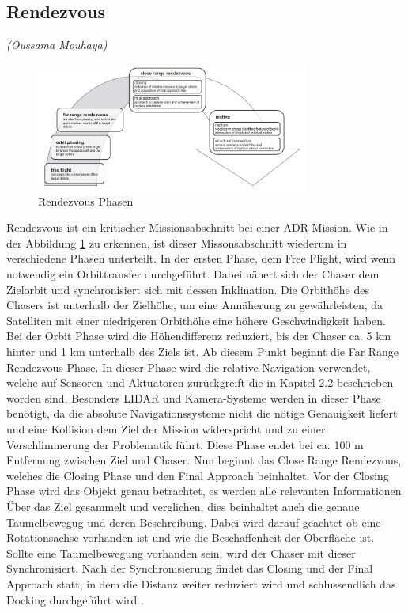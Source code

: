 	\subsection{Rendezvous} 
		\hfill\emph{(Oussama Mouhaya)}\\
	\begin{figure}[h]
			\centering
					\includegraphics[width=0.80\textwidth]{./graphics/ADR/Rendezvous.PNG}
				\caption{Rendezvous Phasen\cite{Castronuovo.2011}}
				\label{fig:Rendezvous}
			\end{figure}
Rendezvous ist ein kritischer Missionsabschnitt bei einer ADR Mission. Wie in der Abbildung \ref{fig:Rendezvous} zu erkennen, ist dieser Missonsabschnitt wiederum in verschiedene Phasen unterteilt. In der ersten Phase, dem Free Flight, wird wenn notwendig ein Orbittransfer durchgeführt. Dabei nähert sich der Chaser dem Zielorbit und synchronisiert sich mit dessen Inklination. Die Orbithöhe des Chasers ist unterhalb der Zielhöhe, um eine Annäherung zu gewährleisten, da Satelliten mit einer niedrigeren Orbithöhe eine höhere Geschwindigkeit haben. Bei der Orbit Phase wird die Höhendifferenz reduziert, bis der Chaser ca. 5 km hinter und 1 km unterhalb des Ziels ist. Ab diesem Punkt beginnt die Far Range Rendezvous Phase. In dieser Phase wird die relative Navigation verwendet, welche auf Sensoren und Aktuatoren zurückgreift die in Kapitel 2.2 beschrieben worden sind. Besonders LIDAR und Kamera-Systeme werden in dieser Phase benötigt, da die absolute Navigationssysteme nicht die nötige Genauigkeit liefert und eine Kollision dem Ziel der Mission widerspricht und zu einer Verschlimmerung der Problematik führt. Diese Phase endet bei ca. 100 m Entfernung zwischen Ziel und Chaser. Nun beginnt das Close Range Rendezvous, welches die Closing Phase und den Final Approach beinhaltet. Vor der Closing Phase wird das Objekt genau betrachtet, es werden alle relevanten Informationen Über das Ziel gesammelt und verglichen, dies beinhaltet auch die genaue Taumelbewegug und deren Beschreibung. Dabei wird darauf geachtet ob eine Rotationsachse vorhanden ist und wie die Beschaffenheit der Oberfläche ist. Sollte eine Taumelbewegung vorhanden sein, wird der Chaser mit dieser Synchronisiert. Nach der Synchronisierung findet das Closing und der Final Approach statt, in dem die Distanz weiter reduziert wird und schlussendlich das Docking durchgeführt wird \cite{Castronuovo.2011}. 
 
